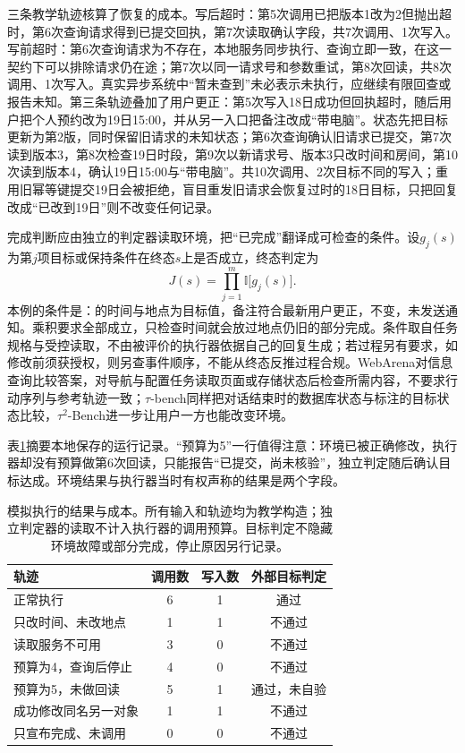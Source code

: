 三条教学轨迹核算了恢复的成本。写后超时：第5次调用已把版本1改为2但抛出超时，第6次查询请求得到已提交回执，第7次读取确认字段，共7次调用、1次写入。写前超时：第6次查询请求为不存在，本地服务同步执行、查询立即一致，在这一契约下可以排除请求仍在途；第7次以同一请求号和参数重试，第8次回读，共8次调用、1次写入。真实异步系统中“暂未查到”未必表示未执行，应继续有限回查或报告未知。第三条轨迹叠加了用户更正：第5次写入18日成功但回执超时，随后用户把个人预约改为19日15:00，并从另一入口把备注改成“带电脑”。状态先把目标更新为第2版，同时保留旧请求的未知状态；第6次查询确认旧请求已提交，第7次读到版本3，第8次检查19日时段，第9次以新请求号、版本3只改时间和房间，第10次读到版本4，确认19日15:00与“带电脑”。共10次调用、2次目标不同的写入；重用旧幂等键提交19日会被拒绝，盲目重发旧请求会恢复过时的18日目标，只把回复改成“已改到19日”则不改变任何记录。

完成判断应由独立的判定器读取环境，把“已完成”翻译成可检查的条件。设$g_j(s)$为第$j$项目标或保持条件在终态$s$上是否成立，终态判定为
\begin{equation}
 J(s)=\prod_{j=1}^{m}\mathbb{I}\bigl[g_j(s)\bigr].
 \label{eq:nlp-execution-completion}
\end{equation}
本例的条件是：的时间与地点为目标值，备注符合最新用户更正，不变，未发送通知。乘积要求全部成立，只检查时间就会放过地点仍旧的部分完成。条件取自任务规格与受控读取，不由被评价的执行器依据自己的回复生成；若过程另有要求，如修改前须获授权，则另查事件顺序，不能从终态反推过程合规。WebArena对信息查询比较答案，对导航与配置任务读取页面或存储状态后检查所需内容，不要求行动序列与参考轨迹一致；$\tau$-bench同样把对话结束时的数据库状态与标注的目标状态比较，$\tau^2$-Bench进一步让用户一方也能改变环境。

表\ref{tab:nlp-execution-outcomes}摘要本地保存的运行记录。“预算为5”一行值得注意：环境已被正确修改，执行器却没有预算做第6次回读，只能报告“已提交，尚未核验”，独立判定随后确认目标达成。环境结果与执行器当时有权声称的结果是两个字段。

\begin{table}[htbp]
  \centering
  \begin{tabular}{lccc}
    \toprule
    轨迹 & 调用数 & 写入数 & 外部目标判定 \\
    \midrule
    正常执行 & 6 & 1 & 通过 \\
    只改时间、未改地点 & 1 & 1 & 不通过 \\
    读取服务不可用 & 3 & 0 & 不通过 \\
    预算为4，查询后停止 & 4 & 0 & 不通过 \\
    预算为5，未做回读 & 5 & 1 & 通过，未自验 \\
    成功修改同名另一对象 & 1 & 1 & 不通过 \\
    只宣布完成、未调用 & 0 & 0 & 不通过 \\
    \bottomrule
  \end{tabular}
  \caption{模拟执行的结果与成本。所有输入和轨迹均为教学构造；独立判定器的读取不计入执行器的调用预算。目标判定不隐藏环境故障或部分完成，停止原因另行记录。}
  \label{tab:nlp-execution-outcomes}
\end{table}

